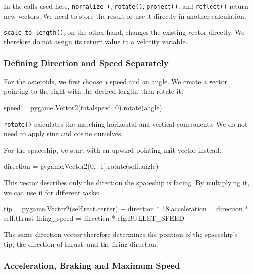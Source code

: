 \begin{hintbox}
In the calls used here, \texttt{normalize()}, \texttt{rotate()}, \texttt{project()}, and \texttt{reflect()} return new vectors.	We need to store the result or use it directly in another calculation.
	
\texttt{scale\_to\_length()}, on the other hand, changes the existing vector directly. We therefore do not assign its return value to a velocity variable.
\end{hintbox}

\subsubsection*{Defining Direction and Speed Separately}

For the asteroids, we first choose a speed and an angle. We create a vector pointing to the right with the desired length, then rotate it:
\begin{codebox}
	speed = pygame.Vector2(totalspeed, 0).rotate(angle)
\end{codebox}

\texttt{rotate()} calculates the matching horizontal and vertical components. We do not need to apply sine and cosine ourselves.

For the spaceship, we start with an upward-pointing unit vector instead:
\begin{codebox}
	direction = pygame.Vector2(0, -1).rotate(self.angle)
\end{codebox}

This vector describes only the direction the spaceship is facing. By multiplying it, we can use it for different tasks:
\begin{codebox}
tip = pygame.Vector2(self.rect.center) + direction * 18
acceleration = direction * self.thrust
firing_speed = direction * cfg.BULLET_SPEED
\end{codebox}

The same direction vector therefore determines the position of the spaceship's tip, the direction of thrust, and the firing direction.

\subsubsection*{Acceleration, Braking and Maximum Speed}

